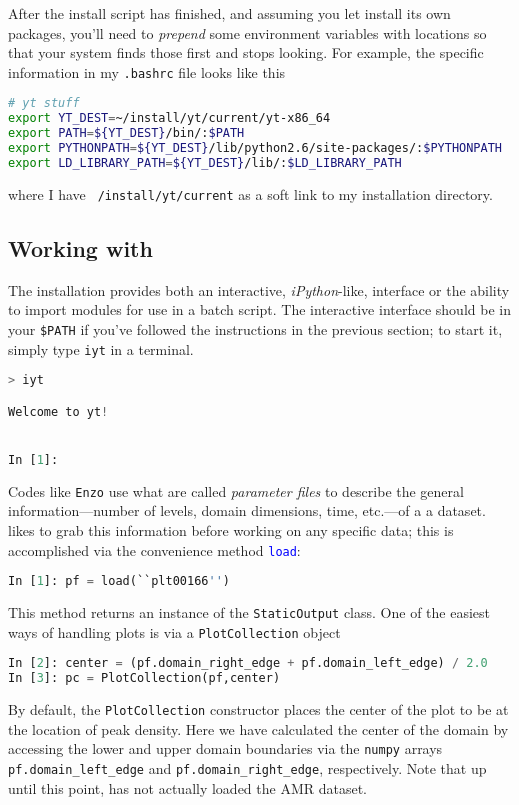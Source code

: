 After the install script has finished, and assuming you let \yt install its own packages, you'll need to {\it prepend} some environment variables with \yt locations so that your system finds those first and stops looking.  For example, the \yt specific information in my {\tt .bashrc} file looks like this
\begin{lstlisting}[language=bash,mathescape=false]
# yt stuff
export YT_DEST=~/install/yt/current/yt-x86_64
export PATH=${YT_DEST}/bin/:$PATH
export PYTHONPATH=${YT_DEST}/lib/python2.6/site-packages/:$PYTHONPATH
export LD_LIBRARY_PATH=${YT_DEST}/lib/:$LD_LIBRARY_PATH
\end{lstlisting}
where I have {\tt ~/install/yt/current} as a soft link to my \yt
installation directory.

\subsection{Working with \yt}
The \yt installation provides both an interactive, {\it iPython}-like,
interface or the ability to import \yt modules for use in a batch
script.  The interactive interface should be in your {\tt \$PATH} if
you've followed the instructions in the previous section; to start it,
simply type {\tt iyt} in a terminal.
\begin{lstlisting}[language=Python]
> iyt

Welcome to yt!


In [1]: 
\end{lstlisting}
Codes like {\tt Enzo} use what are called {\it parameter files} to
describe the general information---number of levels, domain
dimensions, time, etc.---of a a dataset.  \yt likes to grab this
information before working on any specific data; this is accomplished
via the convenience method \textcolor{blue}{\tt load}:
\begin{lstlisting}[language=Python]
In [1]: pf = load(``plt00166'')
\end{lstlisting}
This method returns an instance of the {\tt StaticOutput} class.  One
of the easiest ways of handling plots is via a {\tt PlotCollection}
object
\begin{lstlisting}[language=Python]
In [2]: center = (pf.domain_right_edge + pf.domain_left_edge) / 2.0
In [3]: pc = PlotCollection(pf,center)
\end{lstlisting}
By default, the {\tt PlotCollection} constructor places the center of
the plot to be at the location of peak density.  Here we have
calculated the center of the domain by accessing the lower and upper
domain boundaries via the {\tt numpy} arrays {\tt
  pf.domain\_left\_edge} and {\tt pf.domain\_right\_edge},
respectively.  Note that up until this point, \yt has not actually
loaded the AMR dataset.


